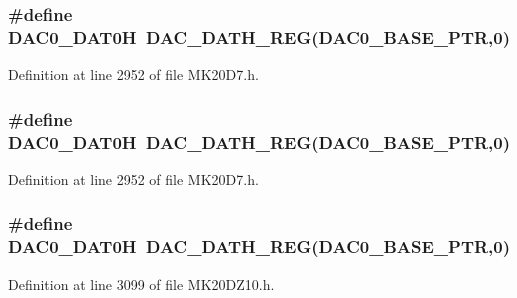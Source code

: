 \subsubsection[{\texorpdfstring{D\+A\+C0\+\_\+\+D\+A\+T0H}{DAC0_DAT0H}}]{\setlength{\rightskip}{0pt plus 5cm}\#define D\+A\+C0\+\_\+\+D\+A\+T0H~{\bf D\+A\+C\+\_\+\+D\+A\+T\+H\+\_\+\+R\+EG}({\bf D\+A\+C0\+\_\+\+B\+A\+S\+E\+\_\+\+P\+TR},0)}\hypertarget{group___d_a_c___register___accessor___macros_ga3ad29b1caa28a60ed8fbb86aa56b76e6}{}\label{group___d_a_c___register___accessor___macros_ga3ad29b1caa28a60ed8fbb86aa56b76e6}


Definition at line 2952 of file M\+K20\+D7.\+h.

\subsubsection[{\texorpdfstring{D\+A\+C0\+\_\+\+D\+A\+T0H}{DAC0_DAT0H}}]{\setlength{\rightskip}{0pt plus 5cm}\#define D\+A\+C0\+\_\+\+D\+A\+T0H~{\bf D\+A\+C\+\_\+\+D\+A\+T\+H\+\_\+\+R\+EG}({\bf D\+A\+C0\+\_\+\+B\+A\+S\+E\+\_\+\+P\+TR},0)}\hypertarget{group___d_a_c___register___accessor___macros_ga3ad29b1caa28a60ed8fbb86aa56b76e6}{}\label{group___d_a_c___register___accessor___macros_ga3ad29b1caa28a60ed8fbb86aa56b76e6}


Definition at line 2952 of file M\+K20\+D7.\+h.

\subsubsection[{\texorpdfstring{D\+A\+C0\+\_\+\+D\+A\+T0H}{DAC0_DAT0H}}]{\setlength{\rightskip}{0pt plus 5cm}\#define D\+A\+C0\+\_\+\+D\+A\+T0H~{\bf D\+A\+C\+\_\+\+D\+A\+T\+H\+\_\+\+R\+EG}({\bf D\+A\+C0\+\_\+\+B\+A\+S\+E\+\_\+\+P\+TR},0)}\hypertarget{group___d_a_c___register___accessor___macros_ga3ad29b1caa28a60ed8fbb86aa56b76e6}{}\label{group___d_a_c___register___accessor___macros_ga3ad29b1caa28a60ed8fbb86aa56b76e6}


Definition at line 3099 of file M\+K20\+D\+Z10.\+h.

